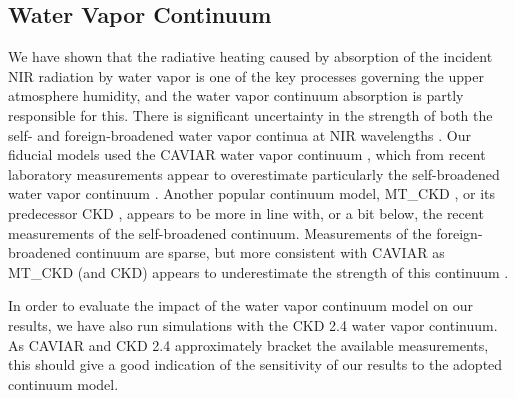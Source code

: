 \documentclass[11pt,numberedappendix,twocolappendix,]{emulateapj}
\begin{document}
{\bf 
\subsection{Water Vapor Continuum}
\label{ss:sensitivity_continuum}


We have shown that the radiative heating caused by absorption of the incident NIR radiation by water vapor is one of the key processes governing the upper atmosphere humidity, and the water vapor continuum absorption is partly responsible for this. 
There is significant uncertainty in the strength of both the self- and foreign-broadened water vapor continua at NIR wavelengths \citep{Shine2016,Campargue2016}. 
Our fiducial models used the CAVIAR water vapor continuum \citep{Ptashnik2011}, which from recent laboratory measurements appear to overestimate particularly the self-broadened water vapor continuum \citep{Shine2016}. 
Another popular continuum model, MT\_CKD \citep{Mlawer2012}, or its predecessor CKD \citep{Clough1989}, appears to be more in line with, or a bit below, the recent measurements of the self-broadened continuum. 
Measurements of the foreign-broadened continuum are sparse, but more consistent with CAVIAR as MT\_CKD (and CKD) appears to underestimate the strength of this continuum \citep{Shine2016}. 


In order to evaluate the impact of the water vapor continuum model on our results, we have also run simulations with the CKD 2.4 water vapor continuum. 
As CAVIAR and CKD 2.4 approximately bracket the available measurements, this should give a good indication of the sensitivity of our results to the adopted continuum model.



}
\end{document}
